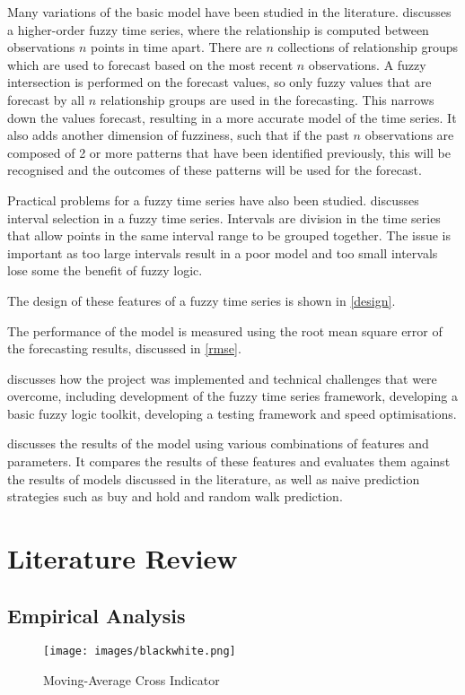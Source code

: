 \documentclass{article}
\theoremstyle{definition}
\begin{document}
Many variations of the basic model have been studied in the literature.  discusses a higher-order fuzzy time series, where the relationship is computed between observations $n$ points in time apart. There are $n$ collections of relationship groups which are used to forecast based on the most recent $n$ observations. A fuzzy intersection is performed on the forecast values, so only fuzzy values that are forecast by all $n$ relationship groups are used in the forecasting. This narrows down the values forecast, resulting in a more accurate model of the time series. It also adds another dimension of fuzziness, such that if the past $n$ observations are composed of 2 or more patterns that have been identified previously, this will be recognised and the outcomes of these patterns will be used for the forecast.

Practical problems for a fuzzy time series have also been studied.  discusses interval selection in a fuzzy time series. Intervals are division in the time series that allow points in the same interval range to be grouped together. The issue is important as too large intervals result in a poor model and too small intervals lose some the benefit of fuzzy logic.

The design of these features of a fuzzy time series is shown in \cref{design}.

The performance of the model is measured using the root mean square error of the forecasting results, discussed in \cref{rmse}.

 discusses how the project was implemented and technical challenges that were overcome, including development of the fuzzy time series framework, developing a basic fuzzy logic toolkit, developing a testing framework and speed optimisations.

 discusses the results of the model using various combinations of features and parameters. It compares the results of these features and evaluates them against the results of models discussed in the literature, as well as naive prediction strategies such as buy and hold and random walk prediction.

\section{Literature Review}

\subsection{Empirical Analysis}
\label{ta}
\begin{figure}[H]
    \centering
    \texttt{[image: images/blackwhite.png]}
    \caption{Moving-Average Cross Indicator}
\end{figure}
\end{document}
